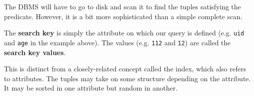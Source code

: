   The DBMS will have to go to disk and scan it to find the tuples satisfying the predicate. However, it is a bit more sophisticated than a simple complete scan. 

  \begin{definition}
    The \textbf{search key} is simply the attribute on which our query is defined (e.g. \texttt{uid} and \texttt{age} in the example above). The values (e.g. \texttt{112} and \texttt{12}) are called the \textbf{search key values}. 
  \end{definition} 

  This is distinct from a closely-related concept called the index, which also refers to attributes. The tuples may take on some structure depending on the attribute. It may be sorted in one attribute but random in another. 


